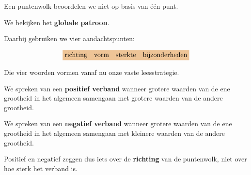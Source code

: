 \documentclass{ximera}
\begin{document}

Een puntenwolk beoordelen we niet op basis van één punt.

We bekijken het \textbf{globale patroon}.

Daarbij gebruiken we vier aandachtspunten:

\[
\important{
\text{richting}
\quad
\text{vorm}
\quad
\text{sterkte}
\quad
\text{bijzonderheden}
}
\]

Die vier woorden vormen vanaf nu onze vaste leesstrategie.



\begin{definitie}
We spreken van een \textbf{positief verband} wanneer grotere waarden
van de ene grootheid in het algemeen samengaan met grotere waarden
van de andere grootheid.

We spreken van een \textbf{negatief verband} wanneer grotere waarden
van de ene grootheid in het algemeen samengaan met kleinere waarden
van de andere grootheid.
\end{definitie}

Positief en negatief zeggen dus iets over de \textbf{richting} van
de puntenwolk, niet over hoe sterk het verband is.

\begin{center}
\end{center}
\end{document}
